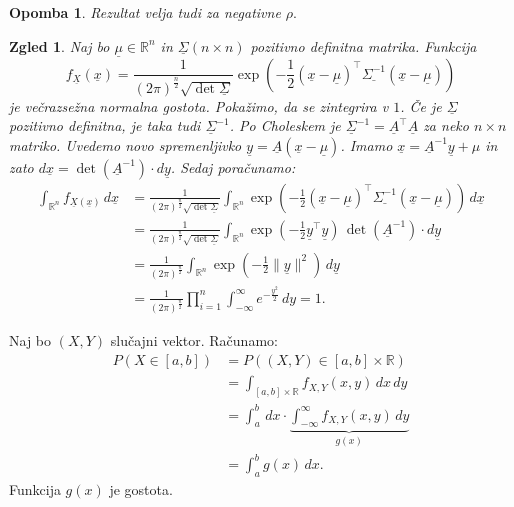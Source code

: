\documentclass[10pt, a4paper]{article}
\newtheorem*{opomba}{Opomba}
\newtheorem{zgled}[izr]{Zgled}
\newcommand{\R}{\mathbb {R}}
\begin{document}
\begin{opomba}
  Rezultat velja tudi za negativne $\rho.$
\end{opomba}

\begin{zgled}
  Naj bo $\underline{\mu} \in \R^n$ in $\underline{\Sigma} (n \times n)$ pozitivno definitna matrika.
  Funkcija
  $$f_{\underline{X}} (\underline{x}) = \frac{1}{{(2 \pi)}^{\frac{n}{2}} \sqrt{\det \underline{\Sigma}}} \exp\left(-\frac{1}{2} (\underline{x} - \underline{\mu})^\top \underline{\Sigma^{-1}} (\underline{x} - \underline{\mu})\right)$$
  je večrazsežna normalna gostota. Pokažimo, da se zintegrira v $1$.
  Če je $\underline{\Sigma}$ pozitivno definitna, je taka tudi $\underline{\Sigma}^{-1}$.
  Po Choleskem je $\underline{\Sigma}^{-1} = \underline{A}^\top \underline{A}$ za neko $n \times n$ matriko.
  Uvedemo novo spremenljivko $\underline{y} = \underline{A} (\underline{x} - \underline{\mu})$.
  Imamo $\underline{x} = \underline{A}^{-1} \underline{y} + \mu$ in zato $d\underline{x} = \det(\underline{A}^{-1}) \cdot d\underline{y}$.
  Sedaj poračunamo:
  \begin{align*}
    \int_{\R^n} f_{\underline{X} (\underline{x})}\, d\underline{x} &= \frac{1}{{(2 \pi)}^{\frac{n}{2}} \sqrt{\det \underline{\Sigma}}} \int_{\R^n} \exp\left(-\frac{1}{2} (\underline{x} - \underline{\mu})^\top \underline{\Sigma^{-1}} (\underline{x} - \underline{\mu})\right)\, d\underline{x}\\
    &= \frac{1}{{(2 \pi)}^{\frac{n}{2}} \sqrt{\det \underline{\Sigma}}} \int_{\R^n} \exp\left(-\frac{1}{2} \underline{y}^\top \underline{y}\right)\, \det(\underline{A}^{-1}) \cdot d\underline{y}\\
    &= \frac{1}{{(2 \pi)^{\frac{n}{2}}}} \int_{\R^n} \exp\left(-\frac{1}{2} \|\underline{y}\|^2\right)\, d\underline{y}\\
    &= \frac{1}{{(2 \pi)^{\frac{n}{2}}}} \prod_{i = 1}^n \int_{-\infty} ^\infty e^{-\frac{y^2}{2}}\, dy = 1.
  \end{align*}
\end{zgled}

Naj bo $(X, Y)$ slučajni vektor. Računamo:
\begin{align*}
  P(X \in [a, b]) &= P((X, Y) \in [a, b] \times \R)\\
  &= \int_{[a, b] \times \R} f_{X, Y} (x, y)\, dx\, dy\\
  &= \int_a ^b\, dx\cdot \underbrace{\int_{-\infty} ^\infty f_{X, Y} (x, y)\, dy}_{g(x)}\\
  &= \int_a ^b g(x)\, dx.
\end{align*}
Funkcija $g(x)$ je gostota.
\end{document}
